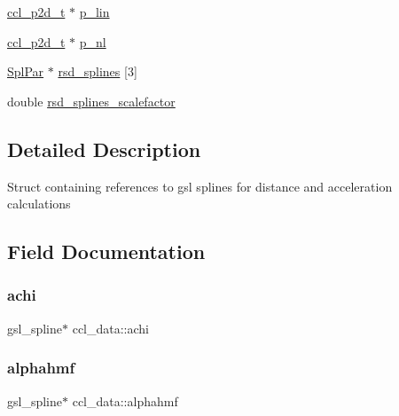 \begin{DoxyCompactItemize}
\mbox{\hyperlink{structccl__p2d__t}{ccl\+\_\+p2d\+\_\+t}} $\ast$ \mbox{\hyperlink{structccl__data_aa2daa15d06d8739adae5a45be494c2c5}{p\+\_\+lin}}
\item 
\mbox{\hyperlink{structccl__p2d__t}{ccl\+\_\+p2d\+\_\+t}} $\ast$ \mbox{\hyperlink{structccl__data_ad5cbffe11bc08c851293f7b72b6a2f90}{p\+\_\+nl}}
\item 
\mbox{\hyperlink{struct_spl_par}{Spl\+Par}} $\ast$ \mbox{\hyperlink{structccl__data_ac655eaa75acfd755a45bb39e2344d800}{rsd\+\_\+splines}} \mbox{[}3\mbox{]}
\item 
double \mbox{\hyperlink{structccl__data_ad599220fa8b248458b36d48906b75d1d}{rsd\+\_\+splines\+\_\+scalefactor}}
\end{DoxyCompactItemize}


\subsection{Detailed Description}
Struct containing references to gsl splines for distance and acceleration calculations 

\subsection{Field Documentation}
\mbox{\label{structccl__data_a0b1087588bd517142a5b6f8c352218e0}} 
\subsubsection{\texorpdfstring{achi}{achi}}
{\footnotesize\ttfamily gsl\+\_\+spline$\ast$ ccl\+\_\+data\+::achi}

\mbox{\label{structccl__data_ad7fad40bf36fed46f5879104247de00b}} 
\subsubsection{\texorpdfstring{alphahmf}{alphahmf}}
{\footnotesize\ttfamily gsl\+\_\+spline$\ast$ ccl\+\_\+data\+::alphahmf}

\mbox{\label{structccl__data_a7ce4d3fb195d2dd11674bcc7e5f96afe}} 
